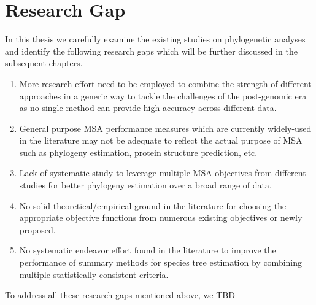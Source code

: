 \section{Research Gap}
In this thesis we carefully examine the existing studies on phylogenetic analyses and identify the following research gaps which will be further discussed in the subsequent chapters.
\begin{enumerate}
	\item  More research effort need to be employed to combine the strength of different approaches in a generic way to tackle the challenges of the post-genomic era as no single method can provide high accuracy across different data. 
	
	
	\item  General purpose MSA performance measures which are currently widely-used in the literature may not be adequate to reflect the actual purpose of MSA such as phylogeny estimation, protein structure prediction, etc.
	
	
	\item  Lack of systematic study to leverage multiple MSA objectives from different studies for better phylogeny estimation over a broad range of data.
	
	
	\item  No solid theoretical/empirical ground in the literature for choosing the appropriate objective functions from numerous existing objectives  or newly proposed.
	
	
	\item No systematic endeavor effort found in the literature to improve the performance of summary methods for species tree estimation by combining multiple statistically consistent criteria.
\end{enumerate}

To address all these research gaps mentioned above, we TBD

